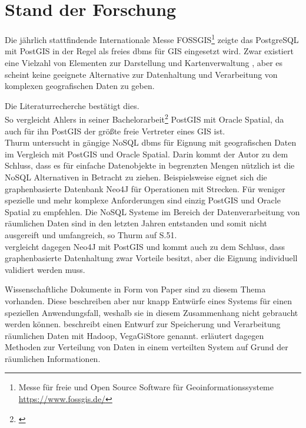 

\section{Stand der Forschung}
Die jährlich stattfindende Internationale Messe FOSSGIS\footnote{Messe für freie und Open Source Software für Geoinformationssysteme \url{https://www.fossgis.de/}} zeigte das PostgreSQL mit PostGIS in der Regel als freies \Gls{dbms} für GIS eingesetzt wird.
Zwar existiert eine Vielzahl von Elementen zur Darstellung und Kartenverwaltung%
, aber es scheint keine geeignete Alternative zur Datenhaltung und Verarbeitung von komplexen geografischen Daten zu geben.

Die Literaturrecherche bestätigt dies.\\
So vergleicht Ahlers in seiner Bachelorarbeit\footnote{\cite{ba:pgvsoracle}} PostGIS mit Oracle Spatial, da auch für ihn PostGIS der größte freie Vertreter eines GIS ist.\\
Thurm untersucht in \cite{ba:nosqlfuergeodaten} gängige NoSQL \Gls{dbms} für Eignung mit geografischen Daten im Vergleich mit PostGIS und Oracle Spatial.
Darin kommt der Autor zu dem Schluss, dass es für einfache Datenobjekte in begrenzten Mengen nützlich ist die NoSQL Alternativen in Betracht zu ziehen.
Beispielsweise eignet sich die graphenbasierte Datenbank Neo4J für Operationen mit Strecken.
Für weniger spezielle und mehr komplexe Anforderungen sind einzig PostGIS und Oracle Spatial zu empfehlen.
Die NoSQL Systeme im Bereich der Datenverarbeitung von räumlichen Daten sind in den letzten Jahren entstanden und somit nicht ausgereift und umfangreich, so Thurm auf S.51.\\
\cite{ma:neo4j} vergleicht dagegen Neo4J mit PostGIS und kommt auch zu dem Schluss, dass graphenbasierte Datenhaltung zwar Vorteile besitzt, aber die Eignung individuell validiert werden muss.

Wissenschaftliche Dokumente in Form von Paper sind zu diesem Thema vorhanden.
Diese beschreiben aber nur knapp Entwürfe eines Systems für einen speziellen Anwendungsfall, weshalb sie in diesem Zusammenhang nicht gebraucht werden können.
\cite{paper:hdfsspatial} beschreibt einen Entwurf zur Speicherung und Verarbeitung räumlichen Daten mit Hadoop, VegaGiStore genannt.
\cite{paper:spatialdistribution} erläutert dagegen Methoden zur Verteilung von Daten in einem verteilten System auf Grund der räumlichen Informationen.

